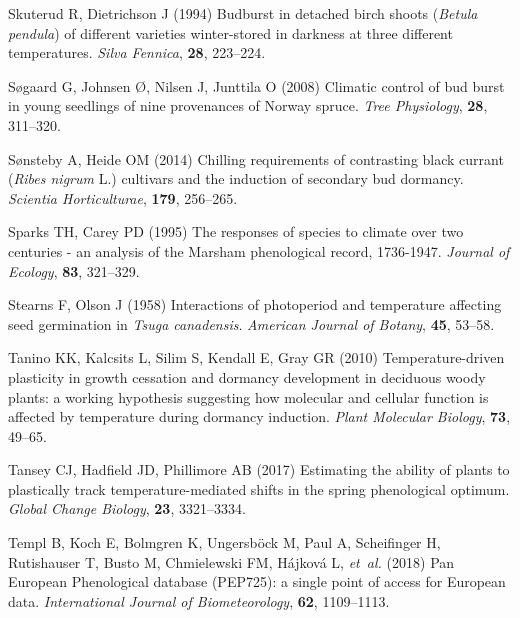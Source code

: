 \documentclass[11pt,letter]{article}
\begin{document}
\begin{thebibliography}{63}
Skuterud R, Dietrichson J (1994) {Budburst in detached birch shoots
  (\emph{Betula pendula}) of different varieties winter-stored in darkness at
  three different temperatures.}
\newblock \emph{Silva Fennica}, \textbf{28}, 223--224.

S{\o}gaard G, Johnsen {\O}, Nilsen J, Junttila O (2008) {Climatic control of
  bud burst in young seedlings of nine provenances of Norway spruce}.
\newblock \emph{Tree Physiology}, \textbf{28}, 311--320.

S{\o}nsteby A, Heide OM (2014) {Chilling requirements of contrasting black
  currant (\emph{Ribes nigrum} L.) cultivars and the induction of secondary bud
  dormancy}.
\newblock \emph{Scientia Horticulturae}, \textbf{179}, 256--265.

Sparks TH, Carey PD (1995) {The responses of species to climate over two
  centuries - an analysis of the Marsham phenological record, 1736-1947}.
\newblock \emph{Journal of Ecology}, \textbf{83}, 321--329.

Stearns F, Olson J (1958) {Interactions of photoperiod and temperature
  affecting seed germination in \emph{Tsuga canadensis}}.
\newblock \emph{American Journal of Botany}, \textbf{45}, 53--58.

Tanino KK, Kalcsits L, Silim S, Kendall E, Gray GR (2010) Temperature-driven
  plasticity in growth cessation and dormancy development in deciduous woody
  plants: a working hypothesis suggesting how molecular and cellular function
  is affected by temperature during dormancy induction.
\newblock \emph{Plant Molecular Biology}, \textbf{73}, 49--65.

Tansey CJ, Hadfield JD, Phillimore AB (2017) Estimating the ability of plants
  to plastically track temperature-mediated shifts in the spring phenological
  optimum.
\newblock \emph{Global Change Biology}, \textbf{23}, 3321--3334.

Templ B, Koch E, Bolmgren K, Ungersb{\"o}ck M, Paul A, Scheifinger H,
  Rutishauser T, Busto M, Chmielewski FM, H{\'a}jkov{\'a} L, \emph{et~al.}
  (2018) {Pan European Phenological database (PEP725): a single point of access
  for European data}.
\newblock \emph{International Journal of Biometeorology}, \textbf{62},
  1109--1113.


\end{thebibliography}
\end{document}

